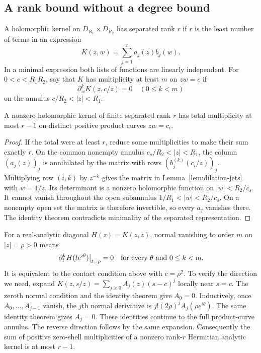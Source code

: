 \subsection{A rank bound without a degree bound}
A holomorphic kernel on $D_{R_1}\times D_{R_2}$ has separated rank $r$ if $r$
is the least number of terms in an expression
\[
 K(z,w)=\sum_{j=1}^r a_j(z)b_j(w).
\]
In a minimal expression both lists of functions are linearly independent.
For $0<c<R_1R_2$, say that $K$ has multiplicity at least $m$ on $zw=c$ if
\[
 \partial_w^kK(z,c/z)=0\quad(0\le k<m)
\]
on the annulus $c/R_2<|z|<R_1$.

\begin{theorem}\label{thm:analytic-contact}
A nonzero holomorphic kernel of finite separated rank $r$ has total
multiplicity at most $r-1$ on distinct positive product curves $zw=c_i$.
\end{theorem}
\begin{proof}
If the total were at least $r$, reduce some multiplicities to make their sum
exactly $r$. On the common nonempty annulus
$c_s/R_2<|z|<R_1$, the column $(a_j(z))_j$ is annihilated by the matrix with
rows $(b_j^{(k)}(c_i/z))_j$. Multiplying row $(i,k)$ by $z^{-k}$ gives the
matrix in Lemma~\ref{lem:dilation-jets} with $w=1/z$. Its determinant is a
nonzero holomorphic function on $|w|<R_2/c_s$. It cannot vanish throughout the
open subannulus $1/R_1<|w|<R_2/c_s$. On a nonempty open set the matrix is
therefore invertible, so every $a_j$ vanishes there. The identity theorem
contradicts minimality of the separated representation.
\end{proof}

For a real-analytic diagonal $H(z)=K(z,\overline z)$, normal vanishing to
order $m$ on $|z|=\rho>0$ means
\[
 \left.\partial_t^k H(te^{i\theta})\right|_{t=\rho}=0
 \quad\hbox{for every $\theta$ and $0\le k<m$}.
\]
It is equivalent to the contact condition above with $c=\rho^2$.
To verify the direction we need, expand
$K(z,s/z)=\sum_{j\ge0}A_j(z)(s-c)^j$ locally near $s=c$.
The zeroth normal condition and the identity theorem give $A_0=0$.
Inductively, once $A_0,\ldots,A_{j-1}$ vanish, the $j$th normal derivative is
$j!(2\rho)^j A_j(\rho e^{i\theta})$. The same identity theorem gives
$A_j=0$. These identities continue to the full product-curve annulus.
The reverse direction follows by the same expansion. Consequently the sum
of positive zero-shell multiplicities of a nonzero rank-$r$ Hermitian
analytic kernel is at most $r-1$.

